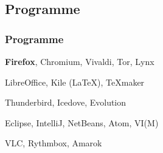 \subsection{Programme}
\begin{frame}[allowframebreaks]
 \frametitle{Programme}
 
\hspace{1cm}

\begin{description}[style=nextline]

\item [ Browser] {\bf Firefox}, Chromium, Vivaldi, Tor, Lynx
\item [Office] LibreOffice, Kile (\LaTeX), \TeX maker
 \item [Email Clients ] Thunderbird, Icedove, Evolution 
 \item [IDEs] Eclipse, IntelliJ, NetBeans, Atom, VI(M)
 \item  [Musik] VLC, Rythmbox, Amarok 

\end{description}
\end{frame}
